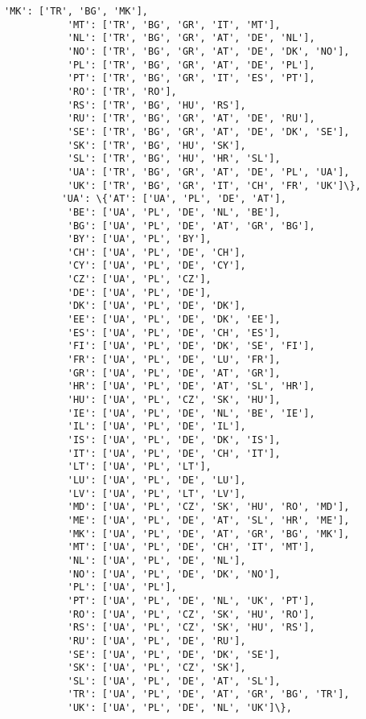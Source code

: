\documentclass[11pt]{article}
\begin{document}
\begin{Verbatim}[commandchars=\\\{\}]
           'MK': ['TR', 'BG', 'MK'],
           'MT': ['TR', 'BG', 'GR', 'IT', 'MT'],
           'NL': ['TR', 'BG', 'GR', 'AT', 'DE', 'NL'],
           'NO': ['TR', 'BG', 'GR', 'AT', 'DE', 'DK', 'NO'],
           'PL': ['TR', 'BG', 'GR', 'AT', 'DE', 'PL'],
           'PT': ['TR', 'BG', 'GR', 'IT', 'ES', 'PT'],
           'RO': ['TR', 'RO'],
           'RS': ['TR', 'BG', 'HU', 'RS'],
           'RU': ['TR', 'BG', 'GR', 'AT', 'DE', 'RU'],
           'SE': ['TR', 'BG', 'GR', 'AT', 'DE', 'DK', 'SE'],
           'SK': ['TR', 'BG', 'HU', 'SK'],
           'SL': ['TR', 'BG', 'HU', 'HR', 'SL'],
           'UA': ['TR', 'BG', 'GR', 'AT', 'DE', 'PL', 'UA'],
           'UK': ['TR', 'BG', 'GR', 'IT', 'CH', 'FR', 'UK']\},
          'UA': \{'AT': ['UA', 'PL', 'DE', 'AT'],
           'BE': ['UA', 'PL', 'DE', 'NL', 'BE'],
           'BG': ['UA', 'PL', 'DE', 'AT', 'GR', 'BG'],
           'BY': ['UA', 'PL', 'BY'],
           'CH': ['UA', 'PL', 'DE', 'CH'],
           'CY': ['UA', 'PL', 'DE', 'CY'],
           'CZ': ['UA', 'PL', 'CZ'],
           'DE': ['UA', 'PL', 'DE'],
           'DK': ['UA', 'PL', 'DE', 'DK'],
           'EE': ['UA', 'PL', 'DE', 'DK', 'EE'],
           'ES': ['UA', 'PL', 'DE', 'CH', 'ES'],
           'FI': ['UA', 'PL', 'DE', 'DK', 'SE', 'FI'],
           'FR': ['UA', 'PL', 'DE', 'LU', 'FR'],
           'GR': ['UA', 'PL', 'DE', 'AT', 'GR'],
           'HR': ['UA', 'PL', 'DE', 'AT', 'SL', 'HR'],
           'HU': ['UA', 'PL', 'CZ', 'SK', 'HU'],
           'IE': ['UA', 'PL', 'DE', 'NL', 'BE', 'IE'],
           'IL': ['UA', 'PL', 'DE', 'IL'],
           'IS': ['UA', 'PL', 'DE', 'DK', 'IS'],
           'IT': ['UA', 'PL', 'DE', 'CH', 'IT'],
           'LT': ['UA', 'PL', 'LT'],
           'LU': ['UA', 'PL', 'DE', 'LU'],
           'LV': ['UA', 'PL', 'LT', 'LV'],
           'MD': ['UA', 'PL', 'CZ', 'SK', 'HU', 'RO', 'MD'],
           'ME': ['UA', 'PL', 'DE', 'AT', 'SL', 'HR', 'ME'],
           'MK': ['UA', 'PL', 'DE', 'AT', 'GR', 'BG', 'MK'],
           'MT': ['UA', 'PL', 'DE', 'CH', 'IT', 'MT'],
           'NL': ['UA', 'PL', 'DE', 'NL'],
           'NO': ['UA', 'PL', 'DE', 'DK', 'NO'],
           'PL': ['UA', 'PL'],
           'PT': ['UA', 'PL', 'DE', 'NL', 'UK', 'PT'],
           'RO': ['UA', 'PL', 'CZ', 'SK', 'HU', 'RO'],
           'RS': ['UA', 'PL', 'CZ', 'SK', 'HU', 'RS'],
           'RU': ['UA', 'PL', 'DE', 'RU'],
           'SE': ['UA', 'PL', 'DE', 'DK', 'SE'],
           'SK': ['UA', 'PL', 'CZ', 'SK'],
           'SL': ['UA', 'PL', 'DE', 'AT', 'SL'],
           'TR': ['UA', 'PL', 'DE', 'AT', 'GR', 'BG', 'TR'],
           'UK': ['UA', 'PL', 'DE', 'NL', 'UK']\},

\end{Verbatim}
\end{document}
